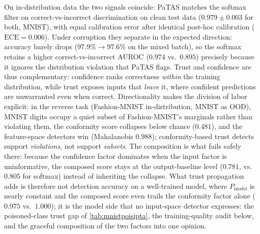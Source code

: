 On in-distribution data the two signals coincide: PaTAS matches the softmax filter on correct-vs-incorrect discrimination on clean test data ($0.979 \pm 0.003$ for both, MNIST), with equal calibration error after identical post-hoc calibration ($\mathrm{ECE}=0.006$). Under corruption they separate in the expected direction: accuracy barely drops ($97.9\% \to 97.6\%$ on the mixed batch), so the softmax retains a higher correct-vs-incorrect AUROC ($0.974$ vs.\ $0.895$) precisely because it ignores the distribution violation that PaTAS flags. Trust and confidence are thus complementary: confidence ranks correctness \emph{within} the training distribution, while trust exposes inputs that \emph{leave} it, where confident predictions are unwarranted even when correct. Directionality makes the division of labor explicit: in the reverse task (Fashion-MNIST in-distribution, MNIST as OOD), MNIST digits occupy a quiet subset of Fashion-MNIST's marginals rather than violating them, the conformity score collapses below chance ($0.481$), and the feature-space detectors win (Mahalanobis $0.988$); conformity-based trust detects support \emph{violations}, not support \emph{subsets}. The composition is what fails safely there: because the confidence factor dominates when the input factor is uninformative, the composed score stays at the output-baseline level ($0.781$, vs.\ $0.805$ for softmax) instead of inheriting the collapse. What trust propagation adds is therefore not detection accuracy on a well-trained model, where $P_{\mathrm{model}}$ is nearly constant and the composed score even trails the conformity factor alone ($0.975$ vs.\ $1.000$); it is the model side that no input-space detector expresses: the poisoned-class trust gap of \cref{tab:mnistpoisipta}, the training-quality audit below, and the graceful composition of the two factors into one opinion.

